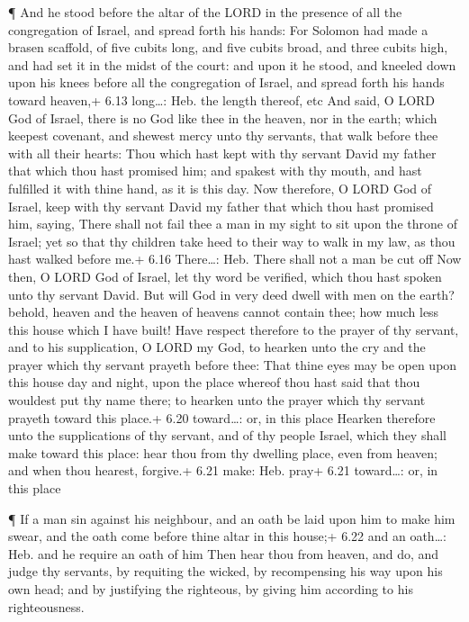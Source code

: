  ¶ And he stood before the altar of the LORD in the
presence of all the congregation of Israel, and spread forth his hands:
 For Solomon had made a brasen scaffold, of five cubits
long, and five cubits broad, and three cubits high, and had set it in
the midst of the court: and upon it he stood, and kneeled down upon his
knees before all the congregation of Israel, and spread forth his hands
toward heaven,+ 6.13 long\ldots: Heb. the length thereof, etc
 And said, O LORD God of Israel, there is no God like thee
in the heaven, nor in the earth; which keepest covenant, and shewest
mercy unto thy servants, that walk before thee with all their hearts:
 Thou which hast kept with thy servant David my father that
which thou hast promised him; and spakest with thy mouth, and hast
fulfilled it with thine hand, as it is this day.  Now
therefore, O LORD God of Israel, keep with thy servant David my father
that which thou hast promised him, saying, There shall not fail thee a
man in my sight to sit upon the throne of Israel; yet so that thy
children take heed to their way to walk in my law, as thou hast walked
before me.+ 6.16 There\ldots: Heb. There shall not a man be cut off
 Now then, O LORD God of Israel, let thy word be verified,
which thou hast spoken unto thy servant David.  But will
God in very deed dwell with men on the earth? behold, heaven and the
heaven of heavens cannot contain thee; how much less this house which I
have built!  Have respect therefore to the prayer of thy
servant, and to his supplication, O LORD my God, to hearken unto the cry
and the prayer which thy servant prayeth before thee:  That
thine eyes may be open upon this house day and night, upon the place
whereof thou hast said that thou wouldest put thy name there; to hearken
unto the prayer which thy servant prayeth toward this place.+ 6.20
toward\ldots: or, in this place  Hearken therefore unto the
supplications of thy servant, and of thy people Israel, which they shall
make toward this place: hear thou from thy dwelling place, even from
heaven; and when thou hearest, forgive.+ 6.21 make: Heb. pray+ 6.21
toward\ldots: or, in this place

 ¶ If a man sin against his neighbour, and an oath be laid
upon him to make him swear, and the oath come before thine altar in this
house;+ 6.22 and an oath\ldots: Heb. and he require an oath of him
 Then hear thou from heaven, and do, and judge thy
servants, by requiting the wicked, by recompensing his way upon his own
head; and by justifying the righteous, by giving him according to his
righteousness.

